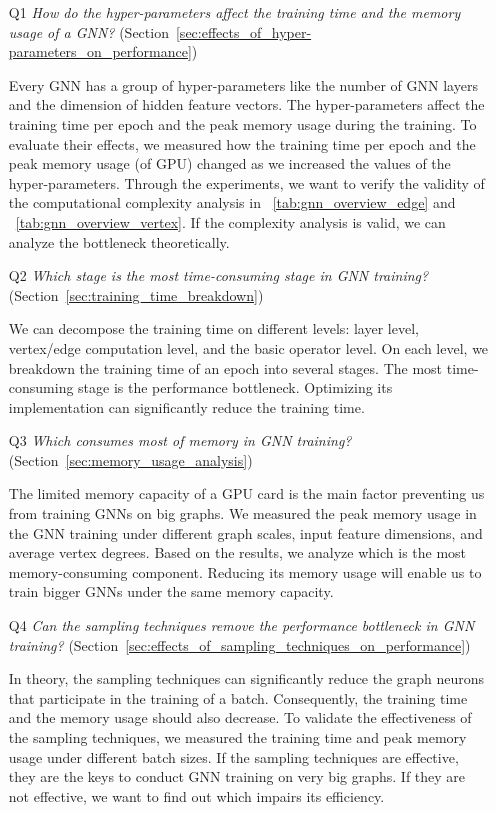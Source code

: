 \begin{itemize}

    \item[Q1] \emph{How do the hyper-parameters affect the training time and the memory usage of a GNN?} (Section~\ref{sec:effects_of_hyper-parameters_on_performance})

          Every GNN has a group of hyper-parameters like the number of GNN layers and the dimension of hidden feature vectors. The hyper-parameters affect the training time per epoch and the peak memory usage during the training.
          To evaluate their effects, we measured how the training time per epoch and the peak memory usage (of GPU) changed as we increased the values of the hyper-parameters.
          Through the experiments, we want to verify the validity of the computational complexity analysis in \tablename~\ref{tab:gnn_overview_edge} and \tablename~\ref{tab:gnn_overview_vertex}.
          If the complexity analysis is valid, we can analyze the bottleneck theoretically.

    \item[Q2] \emph{Which stage is the most time-consuming stage in GNN training?} (Section~\ref{sec:training_time_breakdown})

          We can decompose the training time on different levels: layer level, vertex/edge computation level, and the basic operator level.
          On each level, we breakdown the training time of an epoch into several stages. The most time-consuming stage is the performance bottleneck.
          Optimizing its implementation can significantly reduce the training time.

    \item[Q3] \emph{Which consumes most of memory in GNN training?} (Section~\ref{sec:memory_usage_analysis})

          The limited memory capacity of a GPU card is the main factor preventing us from training GNNs on big graphs.
          We measured the peak memory usage in the GNN training under different graph scales, input feature dimensions, and average vertex degrees.
          Based on the results, we analyze which is the most memory-consuming component.
          Reducing its memory usage will enable us to train bigger GNNs under the same memory capacity.

    \item[Q4] \emph{Can the sampling techniques remove the performance bottleneck in GNN training?} (Section~\ref{sec:effects_of_sampling_techniques_on_performance})

          In theory, the sampling techniques can significantly reduce the graph neurons that participate in the training of a batch.
          Consequently, the training time and the memory usage should also decrease.
          To validate the effectiveness of the sampling techniques, we measured the training time and peak memory usage under different batch sizes.
          If the sampling techniques are effective, they are the keys to conduct GNN training on very big graphs.
          If they are not effective, we want to find out which impairs its efficiency.
\end{itemize}

